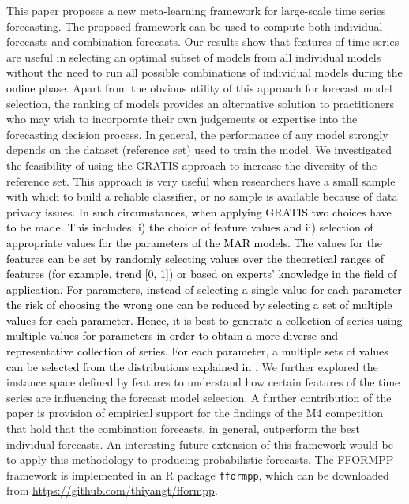 \documentclass[11pt,a4paper,]{article}
\begin{document}
This paper proposes a new meta-learning framework for large-scale time series forecasting. The proposed framework can be used to compute both individual forecasts and combination forecasts. Our results show that features of time series are useful in selecting an optimal subset of models from all individual models without the need to run all possible combinations of individual models \textcolor{black}{during the online phase}. Apart from the obvious utility of this approach for forecast model selection, the ranking of models provides an alternative solution to practitioners who may wish to incorporate their own judgements or expertise into the forecasting decision process. In general, the performance of any model strongly depends on the dataset (reference set) used to train the model. We investigated the feasibility of using the GRATIS approach to increase the diversity of the reference set. This approach is very useful when researchers have a small sample with which to build a reliable classifier, or no sample is available because of data privacy issues. \textcolor{black}{In such circumstances, when applying GRATIS two choices have to be made. This includes: i) the choice of feature values and ii) selection of appropriate values for the parameters of the MAR models.  The values for the features can be set by randomly selecting values over the theoretical ranges of features (for example, trend [0, 1]) or based on experts' knowledge in the field of application. For parameters, instead of selecting a single value for each parameter the risk of choosing the wrong one can be reduced by selecting a set of multiple values for each parameter. Hence, it is best to generate a collection of series using multiple values for parameters in order to obtain a more diverse and representative collection of series. For each parameter, a multiple sets of values can be selected from the distributions explained in} \textcite{kang2019gratis}. We further explored the instance space defined by features to understand how certain features of the time series are influencing the forecast model selection. A further contribution of the paper is provision of empirical support for the findings of the M4 competition \autocite{makridakis2018m4} that hold that the combination forecasts, in general, outperform the best individual forecasts. An interesting future extension of this framework would be to apply this methodology to producing probabilistic forecasts. The FFORMPP framework is implemented in an R package \texttt{fformpp}, which can be downloaded from \url{https://github.com/thiyangt/fformpp}.
\end{document}
